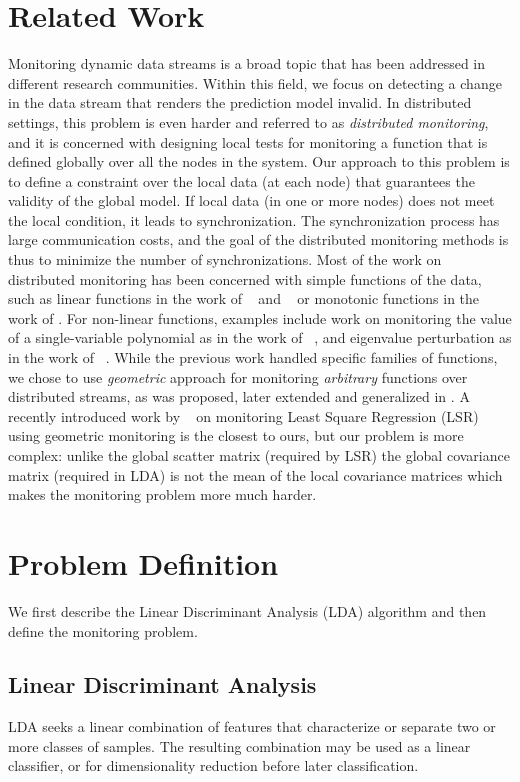 \documentclass{vldb}
\begin{document}
\section{Related Work}
Monitoring dynamic data streams is a broad topic that has been addressed in different research communities. Within this field, we focus on detecting a change in the data stream that renders the prediction model invalid. 
In distributed settings, this problem is even harder and referred to as \textit{distributed monitoring}, and it is concerned with designing local tests for monitoring a function that is defined globally over all the nodes in the system.
Our approach to this problem is to define a constraint over the local data (at each node) that guarantees the validity of the global model. If local data (in one or more nodes) does not meet the local condition, it leads to synchronization. The synchronization process has large communication costs, and the goal of the distributed monitoring methods is thus to minimize the number of synchronizations. Most of the work on distributed monitoring has been concerned with simple functions of the data, such as linear functions in the work of ~\cite{keralapura2006communication} and ~\cite{kashyap2008efficient} or monotonic functions in the work of \cite{michel2005klee}.
For non-linear functions, examples include work on monitoring the value
of a single-variable polynomial as in the work of ~\cite{shah2008handling},
and eigenvalue perturbation as in the work of ~\cite{huang2007communication}.
While the previous work handled specific families of functions, we chose to use \textit{geometric} approach for monitoring \textit{arbitrary} functions over distributed streams, as was proposed, later extended and generalized in \cite{sharfman2007geometric, keren2014geometric, keren2012shape}. A recently introduced work by ~\cite{gabel2015monitoring} on monitoring Least Square Regression (LSR) using geometric monitoring is the closest to ours, but our problem is more complex: unlike the global scatter matrix (required by LSR) the global covariance matrix (required in LDA) is not the mean of the local covariance matrices which makes the monitoring problem more much harder.

\section{Problem Definition}
We first describe the Linear Discriminant Analysis (LDA) algorithm and then define the monitoring problem. 

\subsection{Linear Discriminant Analysis}%
LDA seeks a linear combination of features that characterize or separate two or more classes of samples.
The resulting combination may be used as a linear classifier, or for dimensionality reduction before later classification.
\end{document}
